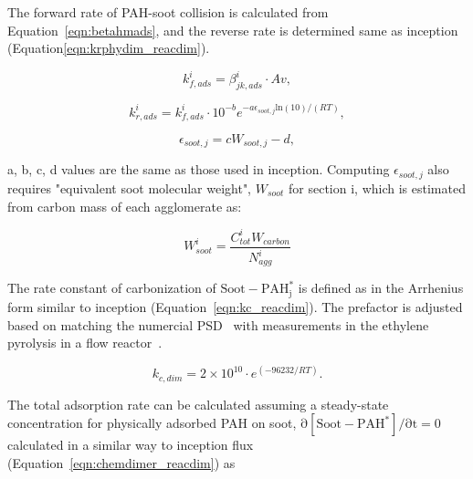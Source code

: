 

The forward rate of PAH-soot collision is calculated from Equation~\eqref{eqn:betahmads}, and the reverse rate is determined same as inception (Equation\eqref{eqn:krphydim_reacdim}).

\begin{equation}
	k^i_{f,ads}=\beta^i_{jk,ads}\cdot Av
	\label{eqn:kfads_reacdim},
\end{equation}

\begin{equation}
	k^i_{r,ads}=k^i_{f,ads}\cdot10^{-b}e^{-a\epsilon_{soot,j} \mathrm{ln}(10)/(RT)}
	\label{eqn:krads_reacdim},
\end{equation}

\begin{equation}
	\epsilon_{soot,j} = cW_{soot,j} -d
	\label{eqn:epsilonads_reacdim},
\end{equation}

a, b, c, d values are the same as those used in inception. Computing ${\epsilon_{soot,j}}$ also requires "equivalent soot molecular weight", ${W_{soot}}$ for section i, which is estimated from carbon mass of each agglomerate as:

\begin{equation}
	W^i_{soot}=\frac{C^i_{tot}W_{carbon}}{N^i_{agg}} 
\end{equation}

The rate constant of carbonization of $\mathrm{Soot-PAH^*_j}$ is defined as in the Arrhenius form similar to inception (Equation~\eqref{eqn:kc_reacdim}). The prefactor is adjusted based on matching the numercial PSD~\citep{naseri2022simulating} with measurements in the ethylene pyrolysis in a flow reactor~\cite{araki2021effects}. 

\begin{equation}
	k_{c,dim} = 2\times10^{10}\cdot e^{(-96232/RT)}
	\label{eqn:kcads_reacdim}.
\end{equation}


The total adsorption rate can be calculated assuming a steady-state concentration for physically adsorbed PAH on soot, $\mathrm{\partial{[{Soot-PAH^*}]}/\partial t = 0}$ calculated in a similar way to inception flux (Equation~\eqref{eqn:chemdimer_reacdim}) as\\

